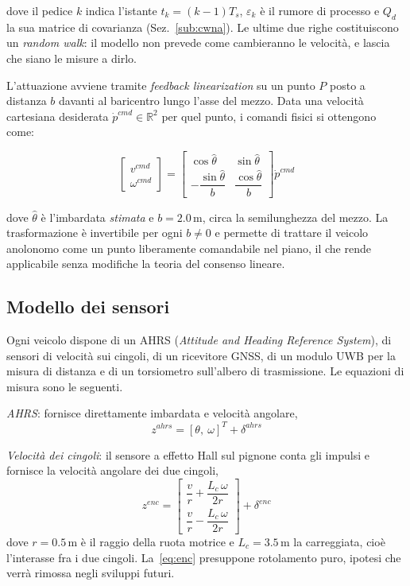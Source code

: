 \documentclass[conference,9pt]{IEEEtran}
\begin{document}
dove il pedice $k$ indica l'istante $t_k = (k-1)T_s$, $\varepsilon_k$ \`e il
rumore di processo e $Q_d$ la sua matrice di covarianza (Sez.~\ref{sub:cwna}).
Le ultime due righe costituiscono un \emph{random walk}: il modello non
prevede come cambieranno le velocit\`a, e lascia che siano le misure a dirlo.

L'attuazione avviene tramite \emph{feedback linearization} su un punto $P$
posto a distanza $b$ davanti al baricentro lungo l'asse del mezzo. Data una
velocit\`a cartesiana desiderata $\dot{p}^{cmd} \in \mathbb{R}^2$ per quel
punto, i comandi fisici si ottengono come:

\begin{equation}
\begin{bmatrix} v^{cmd}\\ \omega^{cmd}\end{bmatrix}
=
\begin{bmatrix}
\cos\hat\theta & \sin\hat\theta\\[1ex]
-\dfrac{\sin\hat\theta}{b} & \dfrac{\cos\hat\theta}{b}
\end{bmatrix}
\dot{p}^{cmd}
\label{eq:fl}
\end{equation}

dove $\hat\theta$ \`e l'imbardata \emph{stimata} e $b = 2.0$\,m, circa la
semilunghezza del mezzo. La trasformazione \`e invertibile per ogni
$b \neq 0$ e permette di trattare il veicolo anolonomo come un punto
liberamente comandabile nel piano, il che rende applicabile senza modifiche
la teoria del consenso lineare.

\subsection{Modello dei sensori}

Ogni veicolo dispone di un AHRS (\emph{Attitude and Heading Reference System}),
di sensori di velocit\`a sui cingoli, di un ricevitore GNSS, di un modulo UWB
per la misura di distanza e di un torsiometro sull'albero di trasmissione.
Le equazioni di misura sono le seguenti.

\emph{AHRS}: fornisce direttamente imbardata e velocit\`a angolare,
\begin{equation}
z^{ahrs} = [\theta,\ \omega]^T + \delta^{ahrs}
\end{equation}

\emph{Velocit\`a dei cingoli}: il sensore a effetto Hall sul pignone conta
gli impulsi e fornisce la velocit\`a angolare dei due cingoli,
\begin{equation}
z^{enc} =
\begin{bmatrix}
\dfrac{v}{r} + \dfrac{L_c\,\omega}{2r}\\[2ex]
\dfrac{v}{r} - \dfrac{L_c\,\omega}{2r}
\end{bmatrix}
+ \delta^{enc}
\label{eq:enc}
\end{equation}
dove $r = 0.5$\,m \`e il raggio della ruota motrice e $L_c = 3.5$\,m la
carreggiata, cio\`e l'interasse fra i due cingoli. La~\eqref{eq:enc}
presuppone rotolamento puro, ipotesi che verr\`a rimossa negli sviluppi futuri.
\end{document}
